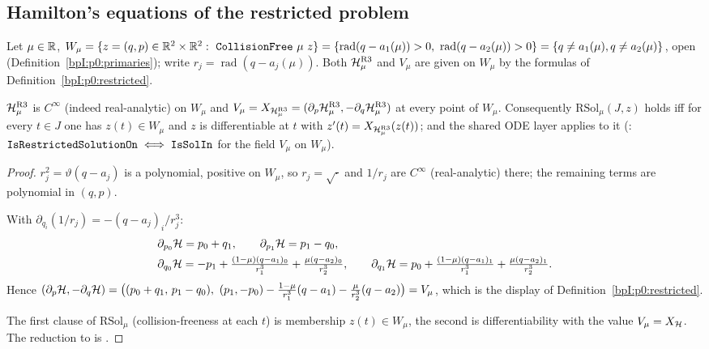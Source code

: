 \subsection{Hamilton's equations of the restricted problem}\label{bpI:p7:sec-ham}

Let $\mu\in\mathbb{R}$, $W_\mu=\{z=(q,p)\in\R^2\times\R^2:\ \Lean{CollisionFree}\ \mu\ z\}=\{\operatorname{rad}(q-a_1(\mu))>0,\ \operatorname{rad}(q-a_2(\mu))>0\}=\{q\ne a_1(\mu),q\ne a_2(\mu)\}$,
open (Definition~\ref{bpI:p0:primaries}); write $r_j=\operatorname{rad}(q-a_j(\mu))$. Both $\mathcal H^{\rm R3}_\mu$ and $V_\mu$ are given on $W_\mu$ by the formulas of Definition~\ref{bpI:p0:restricted}.

\begin{lemma}\label{bpI:p7:ham-eq}
$\mathcal H^{\rm R3}_\mu$ is $C^\infty$ (indeed real-analytic) on $W_\mu$ and $V_\mu=X_{\mathcal H^{\rm R3}_\mu}=(\partial_p\mathcal H^{\rm R3}_\mu,-\partial_q\mathcal H^{\rm R3}_\mu)$ at every point of $W_\mu$.
Consequently $\mathrm{RSol}_\mu(J,z)$ holds iff for every $t\in J$ one has $z(t)\in W_\mu$ and $z$ is differentiable at $t$ with $z'(t)=X_{\mathcal H^{\rm R3}_\mu}(z(t))$; and the shared ODE layer applies to it
(: $\texttt{IsRestrictedSolutionOn}\iff\texttt{IsSolIn}$ for the field $V_\mu$ on $W_\mu$).
\end{lemma}
\begin{proof}
\label{stepI:p7:he-smooth} $r_j^2=\vartheta(q-a_j)$ is a polynomial, positive on $W_\mu$, so $r_j=\sqrt{\cdot}$ and $1/r_j$ are $C^\infty$ (real-analytic) there; the remaining terms are polynomial in $(q,p)$.

\label{stepI:p7:he-deriv} With $\partial_{q_i}(1/r_j)=-(q-a_j)_i/r_j^3$:
\begin{align*}
&\partial_{p_0}\mathcal H=p_0+q_1,\qquad\partial_{p_1}\mathcal H=p_1-q_0,\\
&\partial_{q_0}\mathcal H=-p_1+\tfrac{(1-\mu)(q-a_1)_0}{r_1^3}+\tfrac{\mu(q-a_2)_0}{r_2^3},\qquad
\partial_{q_1}\mathcal H=p_0+\tfrac{(1-\mu)(q-a_1)_1}{r_1^3}+\tfrac{\mu(q-a_2)_1}{r_2^3}.
\end{align*}
Hence $(\partial_p\Ham,-\partial_q\Ham)=\bigl((p_0+q_1,\,p_1-q_0),\ (p_1,-p_0)-\frac{1-\mu}{r_1^3}(q-a_1)-\frac\mu{r_2^3}(q-a_2)\bigr)=V_\mu$, which is the display of Definition~\ref{bpI:p0:restricted}.

\label{stepI:p7:he-sol} The first clause of $\mathrm{RSol}_\mu$ (collision-freeness at each $t$) is membership $z(t)\in W_\mu$, the second is differentiability with the value $V_\mu=X_\mathcal H$. The reduction to  is .
\end{proof}

